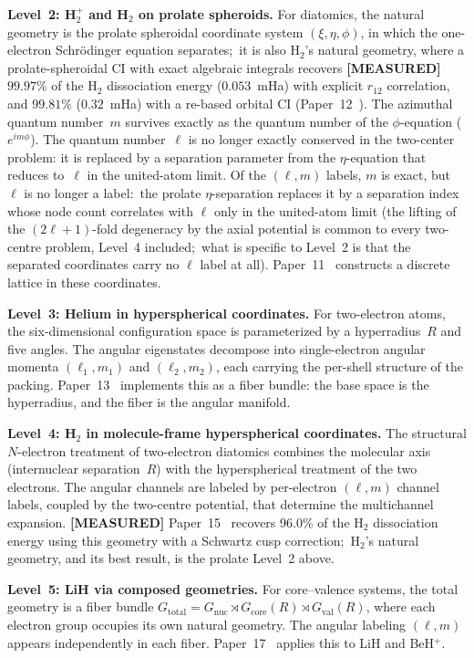 \documentclass[aps,prl,reprint,amsmath,amssymb]{revtex4-2}
\begin{document}
\textbf{Level~2: H$_2^+$ and H$_2$ on prolate spheroids.}
For diatomics, the natural geometry is the prolate
spheroidal coordinate system $(\xi, \eta, \phi)$, in which the
one-electron Schr\"odinger equation separates;\ it is also H$_2$'s
natural geometry, where a prolate-spheroidal CI with exact algebraic
integrals recovers \textbf{[MEASURED]} $99.97\%$ of the H$_2$
dissociation energy ($0.053$~mHa) with explicit $r_{12}$ correlation,
and $99.81\%$ ($0.32$~mHa) with a re-based orbital CI
(Paper~12~\cite{paper12}).  The azimuthal quantum number~$m$
survives exactly as the quantum number of the $\phi$-equation
($e^{im\phi}$).  The quantum number~$\ell$ is no longer exactly conserved in
the two-center problem: it is replaced by a separation parameter from
the $\eta$-equation that reduces to~$\ell$ in the united-atom limit.
Of the $(\ell, m)$ labels, $m$ is exact,
but $\ell$ is no longer a label:\ the prolate
$\eta$-separation replaces it by a separation index whose node count
correlates with $\ell$ only in the united-atom limit (the lifting of the
$(2\ell+1)$-fold degeneracy by the axial potential is common to every
two-centre problem, Level~4 included;\ what is specific to Level~2 is
that the separated coordinates carry no $\ell$ label at all).
Paper~11~\cite{paper11} constructs a discrete lattice in these
coordinates.

\textbf{Level~3: Helium in hyperspherical coordinates.}
For two-electron atoms, the six-dimensional configuration space is
parameterized by a hyperradius~$R$ and five angles.  The angular
eigenstates decompose into single-electron angular momenta
$(\ell_1, m_1)$ and $(\ell_2, m_2)$, each carrying the per-shell
structure of the packing.  Paper~13~\cite{paper13} implements this as
a fiber bundle: the base space is the hyperradius, and the fiber is
the angular manifold.

\textbf{Level~4: H$_2$ in molecule-frame hyperspherical coordinates.}
The structural $N$-electron treatment of two-electron diatomics
combines the molecular axis (internuclear separation~$R$) with the
hyperspherical treatment of the two electrons.  The angular channels
are labeled by per-electron $(\ell, m)$ channel labels, coupled by the
two-centre potential, that determine the multichannel expansion.
\textbf{[MEASURED]} Paper~15~\cite{paper15} recovers 96.0\% of the H$_2$ dissociation
energy using this geometry with a Schwartz cusp correction;\ H$_2$'s natural geometry, and its best
result, is the prolate Level~2 above.

\textbf{Level~5: LiH via composed geometries.}
For core--valence systems, the total geometry is a fiber bundle
$G_{\mathrm{total}} = G_{\mathrm{nuc}} \rtimes G_{\mathrm{core}}(R)
\rtimes G_{\mathrm{val}}(R)$, where each electron group occupies its
own natural geometry.  The angular labeling $(\ell, m)$ appears
independently in each fiber.  Paper~17~\cite{paper17} applies this to
LiH and BeH$^+$.
\end{document}
